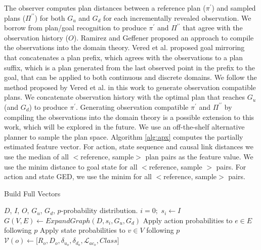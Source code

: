The observer computes plan distances between a reference plan ($\pi^\prime$) and sampled plans ($\Pi^{\prime\prime}$) for both $G_u$ and $G_d$ for each incrementally revealed observation. We borrow from plan/goal recognition to produce $\pi^\prime$ and $\Pi^{\prime\prime}$ that agree with the observation history ($O$). Ramirez and Geffener  proposed an approach to compile the observations into the domain theory. Vered et al.  proposed goal mirroring that concatenates a plan prefix, which agrees with the observations to a plan suffix, which is a plan generated from the last observed point in the prefix to the goal, that can be applied to both continuous and discrete domains. We follow the method proposed by Vered et al.  in this work to generate observation compatible plans. We concatenate observation history with the optimal plan that reaches $G_u$ (and $G_d$) to produce $\pi^\prime$. Generating observation compatible $\pi^\prime$ and $\Pi^{\prime\prime}$ by compiling the observations into the domain theory is a possible extension to this work, which will be explored in the future. We use an off-the-shelf alternative planner to sample the plan space. Algorithm \ref{alg:apx} computes the partially estimated feature vector. For action, state sequence and causal link distances we use the median of all $<$reference, sample$>$ plan pairs as the feature value. We use the minim distance to goal state for all $<$reference, sample $>$ pairs. For action and state GED, we use the minim for all $<$reference, sample$>$ pairs.
\vspace{-2mm}
\begin{algorithm}[tb]
\scriptsize
	\caption{Build Full Vectors}
	\label{alg:exact}
	\begin{algorithmic}[1]
		\Require $D$, $I$, $O$, $G_u$, $G_d$, $p$-probability distribution.
		\State $i=0;$ $ s_i \gets I$
			\State $G(V,E) \gets ExpandGraph(D,s_i,G_u,G_d)$
			\State Apply action probabilities to $e\in E$ following $p$
			\State Apply state probabilities to $v\in V$ following $p$
			\State $\mathcal{V}(o) \gets \lbrack R_o,D_o,\delta_{u_o}, \delta_{d_o}, \mathcal{L}_{{ac}_o},Class\rbrack$
		\EndFor
		\EndProcedure
	\end{algorithmic}
\end{algorithm}
\setlength{\textfloatsep}{2pt}

